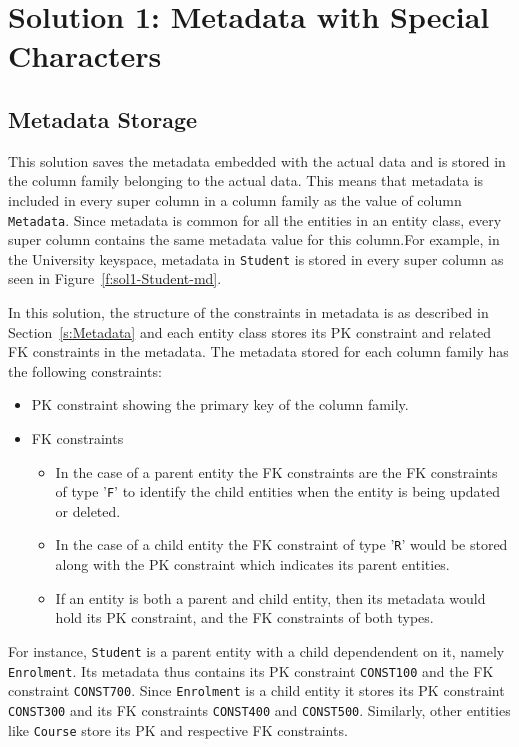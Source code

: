 \section{Solution 1:  Metadata with Special Characters}\label{s:sol1-real}
\subsection{Metadata Storage}
This solution saves the metadata embedded with the actual data and is stored in
the column family belonging to the actual data. This means that metadata is
included in every super column in a column family as the value of column
\texttt{Metadata}. Since metadata is common for all the entities in an entity
class, every super column contains the same metadata value for this column.For
example, in the University keyspace, metadata in \texttt{Student} is stored in
every super column as seen in Figure~\ref{f:sol1-Student-md}.

In this solution, the structure of the constraints in metadata is as described
in Section~\ref{s:Metadata} and each entity class stores  its \ac{PK}
constraint and related \ac{FK} constraints in the metadata. 
The metadata stored for each column family has the following
	constraints:
	\begin{itemize}
	  \item  \ac{PK} constraint showing the primary key of the column family.
	  \item \ac{FK} constraints 
			\begin{itemize}
				\item In the case of a parent entity the \ac{FK} constraints are the \ac{FK}
				constraints of type '\texttt{F}' to identify the child entities when the entity
				is being updated or deleted.
				\item  In the case of a child entity the \ac{FK} constraint of type '\texttt{R}'
				would be stored along with the \ac{PK} constraint which indicates its parent
				entities.
				\item If an entity is both a parent and child entity, then its metadata would
				hold its \ac{PK} constraint, and the \ac{FK} constraints of both types.
			\end{itemize}
	\end{itemize}
	
For instance, \texttt{Student}  is a parent entity with a child dependendent on
it, namely \texttt{Enrolment}. 
Its metadata thus contains its \ac{PK} constraint \texttt{CONST100} and the
\ac{FK} constraint \texttt{CONST700}. Since
\texttt{Enrolment} is a child entity it  stores its \ac{PK} constraint
\texttt{CONST300} and its \ac{FK} constraints \texttt{CONST400} and
\texttt{CONST500}. Similarly, other entities like \texttt{Course} store its
\ac{PK} and respective \ac{FK} constraints.


